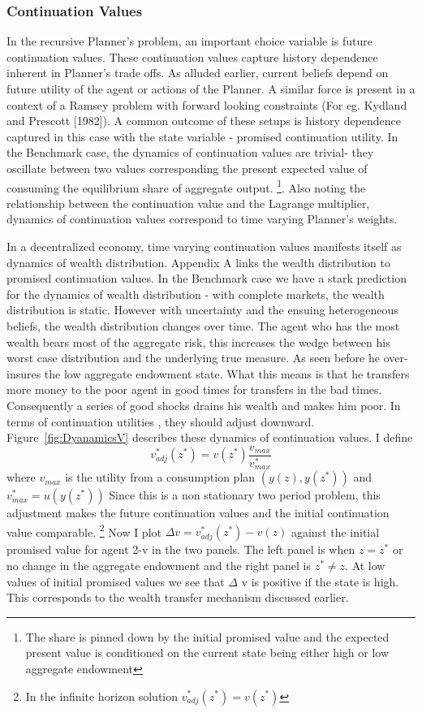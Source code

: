 \documentclass[12pt]{article}
\begin{document}
\subsubsection{Continuation Values}
In the recursive Planner's problem, an important choice variable is future continuation values. These continuation values capture history dependence inherent in Planner's trade offs. As alluded earlier, current beliefs depend on future utility of the agent or actions of the Planner. A similar force is present in a context of a Ramsey problem with forward looking constraints (For eg. Kydland and Prescott [1982]). A common outcome of these setups is history dependence captured in this case with the state variable - promised continuation utility. In the Benchmark case, the dynamics of continuation values are trivial- they oscillate between two values corresponding the present expected value of consuming the equilibrium share of aggregate output. \footnote{The share is pinned down by the initial promised value and the expected present value is conditioned on the current state being either high or low aggregate endowment}. Also noting the relationship between the continuation value and the Lagrange multiplier, dynamics of continuation values correspond to time varying Planner's weights.



\noindent In a decentralized economy, time varying continuation values manifests itself as dynamics of wealth distribution. Appendix A links the wealth distribution to promised continuation values. In the Benchmark case we have a stark prediction for the dynamics of wealth distribution - with complete markets, the wealth distribution is static. However with uncertainty and the ensuing heterogeneous beliefs, the wealth distribution changes over time. The agent who has the most wealth bears most of the aggregate risk, this increases the wedge between his worst case distribution and the underlying true measure. As seen before he over-insures the low aggregate endowment state. What this means is that he transfers more money to the poor agent in good times for transfers in the bad times. Consequently a series of good shocks drains his wealth and makes him poor. In terms of continuation utilities , they should adjust downward. Figure~\ref{fig:DyanamicsV} describes these dynamics of continuation values. I define \[v^*_{adj}(z^*)=v(z^*)\frac{v_{max}}{v^*_{max}}\]
where 
$v_{max}$ is the utility from a consumption plan $(y(z),y(z^*))$ and $v^*_{max} = u(y(z^*))$
Since this is a non stationary two period problem, this adjustment makes the future continuation values and the initial continuation value comparable. \footnote{In the infinite horizon solution $v^*_{adj}(z^*)=v(z^*)$}
Now I plot $\Delta v = v^*_{adj}(z^*)-v(z)$ against the initial promised value for agent 2-v in the two panels. The left panel is when $z=z^*$ or no change in the aggregate endowment and the right panel is $z^*\neq z$. At low values of initial promised values we see that $\Delta$ v is positive if the state is high. This corresponds to the wealth transfer mechanism discussed earlier. 
\end{document}
